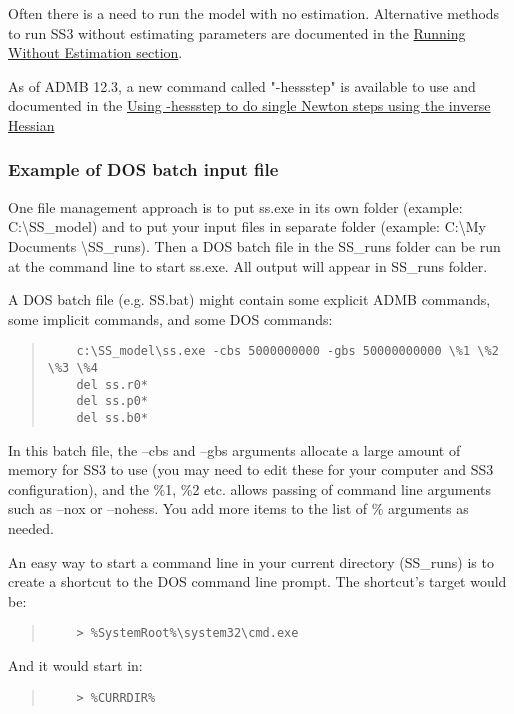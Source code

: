 Often there is a need to run the model with no estimation. Alternative methods to run SS3 without estimating parameters are documented in the \hyperlink{NoEst}{Running Without Estimation section}. 

As of ADMB 12.3, a new command called "-hess{\textunderscore}step" is available to use and documented in the \hyperlink{hess-step}{Using -hess{\textunderscore}step to do single Newton steps using the inverse Hessian}

\subsubsection{Example of DOS batch input file}
One file management approach is to put ss.exe in its own folder (example:  C:\textbackslash SS\_model) and to put your input files in separate folder (example:  C:\textbackslash My Documents \textbackslash SS\_runs).  Then a DOS batch file in the SS\_runs folder can be run at the command line to start ss.exe.  All output will appear in SS\_runs folder.

A DOS batch file (e.g. SS.bat) might contain some explicit ADMB commands, some implicit commands, and some DOS commands:

\begin{quote}
	\begin{verbatim}
	c:\SS_model\ss.exe -cbs 5000000000 -gbs 50000000000 \%1 \%2 \%3 \%4 
	del ss.r0*
	del ss.p0*
	del ss.b0*
	\end{verbatim}
\end{quote}


In this batch file, the –cbs and –gbs arguments allocate a large amount of memory for SS3 to use (you may need to edit these for your computer and SS3 configuration), and the \%1, \%2 etc. allows passing of command line arguments such as –nox or –nohess.  You add more items to the list of \% arguments as needed.

An easy way to start a command line in your current directory (SS\_runs) is to create a shortcut to the DOS command line prompt.  The shortcut’s target would be:

\begin{quote}
	\begin{verbatim}
	> %SystemRoot%\system32\cmd.exe
	\end{verbatim}
\end{quote}


\noindent And it would start in:
\begin{quote}
	\begin{verbatim}
	> %CURRDIR%
	\end{verbatim}
\end{quote}

